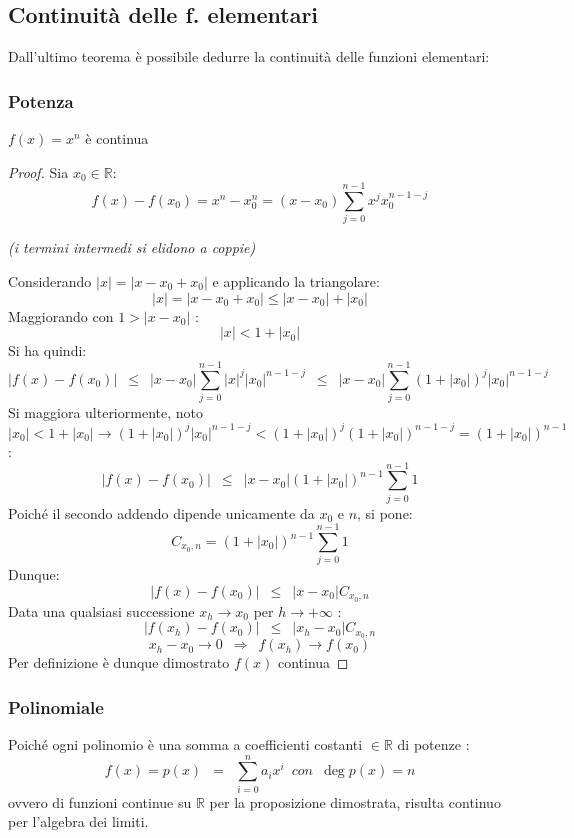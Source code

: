 \documentclass[10pt]{article}
\theoremstyle{plain}
\begin{document}
\hypertarget{elementarii}{\subsection{Continuità delle f. elementari}
Dall'ultimo teorema è possibile dedurre la continuità delle funzioni elementari:}
\subsubsection*{Potenza}
\begin{prop}
$f(x) = x^n$ è continua
\end{prop}
\begin{proof}
Sia $x_0 \in \mathbb{R}$: 
\[f(x) - f(x_0) = x^n - x_0^n = (x-x_0)\sum \limits_{j=0}^{n-1} x^j x_0^{n-1-j} \]
\begin{center} \textit{(i termini intermedi si elidono a coppie)} \end{center}
Considerando $|x| = |x - x_0 + x_0|$ e applicando la triangolare: 
\[|x| = |x-x_0 + x_0| \leq |x - x_0| + |x_0|\] Maggiorando con $1 > |x - x_0|$ : \[|x| < 1 + |x_0|\]
Si ha quindi:
\[|f(x) - f(x_0)| \enspace \leq  \enspace |x-x_0| \sum \limits_{j=0}^{n-1} |x|^j |x_0|^{n-1-j} \enspace \leq \enspace |x-x_0| \sum \limits_{j=0}^{n-1} (1+|x_0|)^j |x_0|^{n-1-j}\]
Si maggiora ulteriormente, noto $|x_0| < 1 + |x_0| \rightarrow (1+|x_0|)^j |x_0|^{n-1-j} < (1+|x_0|)^j (1 + |x_0|)^{n-1-j} = (1 + |x_0|)^{n-1}$:
\[|f(x) - f(x_0)| \enspace \leq  \enspace |x-x_0| (1+|x_0|)^{n-1} \sum \limits_{j=0}^{n-1} 1\]
Poiché il secondo addendo dipende unicamente da $x_0$ e $n$, si pone:
\[C_{x_0, n} = (1+|x_0|)^{n-1} \sum \limits_{j=0}^{n-1} 1\]
Dunque:
\[|f(x) - f(x_0)| \enspace \leq  \enspace |x-x_0|  C_{x_0, n}\]
Data una qualsiasi successione $x_h \longrightarrow x_0$ per $h \rightarrow + \infty$ :
\[|f(x_h) - f(x_0)| \enspace \leq  \enspace |x_h-x_0|  C_{x_0, n}\]
\[x_h-x_0 \rightarrow 0 \enspace \Longrightarrow \enspace f(x_h) \rightarrow f(x_0)\]
Per definizione è dunque dimostrato $f(x)$ continua
\end{proof}

\subsubsection*{Polinomiale}
Poiché ogni polinomio è una somma a coefficienti costanti $\in \mathbb{R}$ di potenze :
\[f(x) = p(x) \enspace = \enspace \sum \limits_{i=0}^n a_i x^i \enspace {con} \enspace \deg p(x) = n\]
ovvero di funzioni continue su $\mathbb{R}$ per la proposizione dimostrata, \hypertarget{contin}{risulta continuo} per l'algebra dei limiti.
\end{document}
